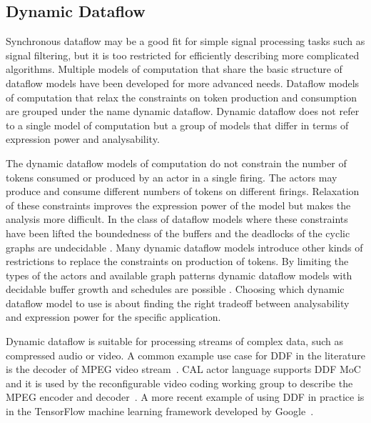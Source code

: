 \subsection{Dynamic Dataflow}
\label{subsec:dynamic-dataflow}
Synchronous dataflow may be a good fit for simple signal processing tasks such as signal filtering, but it is too restricted for efficiently describing more complicated algorithms. Multiple models of computation that share the basic structure of dataflow models have been developed for more advanced needs. Dataflow models of computation that relax the constraints on token production and consumption are grouped under the name dynamic dataflow. Dynamic dataflow does not refer to a single model of computation but a group of models that differ in terms of expression power and analysability.~\cite{bhattacharyya2013handbook}

The dynamic dataflow models of computation do not constrain the number of tokens consumed or produced by an actor in a single firing. The actors may produce and consume different numbers of tokens on different firings. Relaxation of these constraints improves the expression power of the model but makes the analysis more difficult. In the class of dataflow models where these constraints have been lifted the boundedness of the buffers and the deadlocks of the cyclic graphs are undecidable \cite{buck1993scheduling}. Many dynamic dataflow models introduce other kinds of restrictions to replace the constraints on production of tokens. By limiting the types of the actors and available graph patterns dynamic dataflow models with decidable buffer growth and schedules are possible \cite{bhattacharyya2013handbook, gao1992well}. Choosing which dynamic dataflow model to use is about finding the right tradeoff between analysability and expression power for the specific application.

Dynamic dataflow is suitable for processing streams of complex data, such as compressed audio or video. A common example use case for DDF in the literature is the decoder of MPEG video stream~\cite{bhattacharyya2013handbook}. CAL actor language supports DDF MoC and it is used by the reconfigurable video coding working group to describe the MPEG encoder and decoder~\cite{bhattacharyya2011overview}. A more recent example of using DDF in practice is in the TensorFlow machine learning framework developed by Google~\cite{tensorflow2015-whitepaper}.
